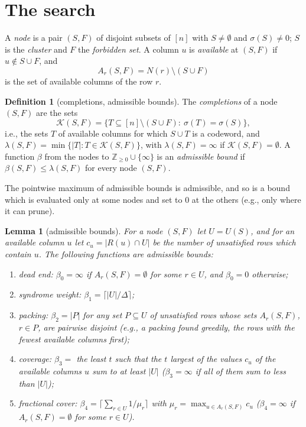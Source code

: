 \documentclass[11pt]{article}
\newtheorem{lemma}[theorem]{Lemma}
\theoremstyle{definition}
\newtheorem{definition}[theorem]{Definition}
\newcommand{\Kc}{\mathcal{K}}   %
\begin{document}
\section{The search}\label{sec:search}

A \emph{node} is a pair $(S,F)$ of disjoint subsets of $[n]$ with $S\neq\emptyset$ and $\sigma(S)\neq0$; $S$ is the
\emph{cluster} and $F$ the \emph{forbidden set}. A column $u$ is \emph{available} at $(S,F)$ if $u\notin S\cup F$, and
\[
  A_r(S,F)=N(r)\setminus(S\cup F)
\]
is the set of available columns of the row $r$.

\begin{definition}[completions, admissible bounds]\label{def:admissible}
The \emph{completions} of a node $(S,F)$ are the sets
\[
  \Kc(S,F)=\{T\subseteq[n]\setminus(S\cup F):\ \sigma(T)=\sigma(S)\},
\]
i.e., the sets $T$ of available columns for which $S\cup T$ is a codeword, and
$\lambda(S,F)=\min\{|T|:T\in\Kc(S,F)\}$, with $\lambda(S,F)=\infty$ if $\Kc(S,F)=\emptyset$. A function $\beta$ from
the nodes to $\mathbb{Z}_{\ge0}\cup\{\infty\}$ is an \emph{admissible bound} if $\beta(S,F)\le\lambda(S,F)$ for every
node $(S,F)$.
\end{definition}

The pointwise maximum of admissible bounds is admissible, and so is a bound which is evaluated only at some nodes and
set to $0$ at the others (e.g., only where it can prune).

\begin{lemma}[admissible bounds]\label{lem:bounds}
For a node $(S,F)$ let $U=U(S)$, and for an available column $u$ let $c_u=|R(u)\cap U|$ be the number of unsatisfied
rows which contain $u$. The following functions are admissible bounds:
\begin{enumerate}[label=(\alph*)]
  \item \emph{dead end}: $\beta_0=\infty$ if $A_r(S,F)=\emptyset$ for some $r\in U$, and $\beta_0=0$ otherwise;
  \item \emph{syndrome weight}: $\beta_1=\lceil|U|/\Delta\rceil$;
  \item \emph{packing}: $\beta_2=|P|$ for any set $P\subseteq U$ of unsatisfied rows whose sets $A_r(S,F)$, $r\in P$,
    are pairwise disjoint (e.g., a packing found greedily, the rows with the fewest available columns first);
  \item \emph{coverage}: $\beta_3=$ the least $t$ such that the $t$ largest of the values $c_u$ of the available
    columns $u$ sum to at least $|U|$ ($\beta_3=\infty$ if all of them sum to less than $|U|$);
  \item \emph{fractional cover}: $\beta_4=\bigl\lceil\sum_{r\in U}1/\mu_r\bigr\rceil$ with
    $\mu_r=\max_{u\in A_r(S,F)}c_u$ ($\beta_4=\infty$ if $A_r(S,F)=\emptyset$ for some $r\in U$).
\end{enumerate}
\end{lemma}
\end{document}
